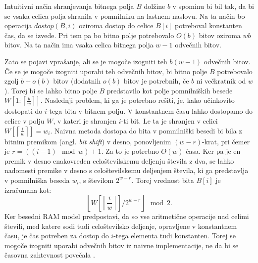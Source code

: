 
Intuitivni način shranjevanja bitnega polja $B$ dolžine $b$ v spominu bi bil tak, da bi se vsaka celica polja shranila v pomnilniku na lastnem naslovu. Na ta način bo operacija $dostop(B,i)$ oziroma dostop do celice $B[i]$ potreboval konstanten čas, da se izvede. Pri tem pa bo bitno polje potrebovalo $O(b)$ bitov oziroma $wb$ bitov. Na ta način ima vsaka celica bitnega polja $w-1$ odvečnih bitov. 

Zato se pojavi vprašanje, ali se je mogoče izogniti teh $b(w-1)$ odvečnih bitov. Če se je mogoče izogniti uporabi teh odvečnih bitov, bi bitno polje $B$ potrebovalo zgolj $b+o(b)$ bitov (dodatnih $o(b)$ bitov je potrebnih, če $b$ ni večkratnik od $w$). Torej bi se lahko bitno polje $B$ predstavilo kot polje pomnilniških besede $W\left[1:\left\lceil\frac{b}{w}\right\rceil\right]$. Naslednji problem, ki ga je potrebno rešiti, je, kako učinkovito dostopati do $i$-tega bita v bitnem polju. V konstantnem času lahko dostopamo do celice v polju $W$, v kateri je shranjen $i$-ti bit. Le ta je shranjen v celici $W\left[\left\lceil\frac{i}{w}\right\rceil\right]=w_i$. Naivna metoda dostopa do bita v pomnilniški besedi bi bila z bitnim premikom (angl. \textit{bit shift}) v desno, ponovljenim $(w-r)$-krat, pri čemer je $r=((i-1)\mod{w}) +1$. Za to je potrebno $O(w)$ časa. Ker pa je en premik v desno enakovreden celoštevilskemu deljenju števila z dva, se lahko nadomesti premike v desno s celoštevilskemu deljenjem števila, ki ga predstavlja v pomnilniška beseda $w_i$, s številom $2^{w-r}$. Torej vrednost bita $B[i]$ je izračunana kot:
$$
    \left\lfloor W\left[\left\lceil\frac{i}{w}\right\rceil\right]/2^{w-r}\right\rfloor \mod{2}.
$$
Ker besedni RAM model predpostavi, da so vse aritmetične operacije nad celimi števili, med katere sodi tudi celoštevilsko deljenje, opravljene v konstantnem času, je čas potreben za dostop do $i$-tega elementa tudi konstanten. Torej se mogoče izogniti uporabi odvečnih bitov iz naivne implementacije, ne da bi se časovna zahtevnost povečala \cite{Navarro2016}.

